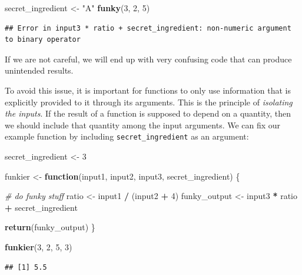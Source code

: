 \documentclass[
]{book}
\newenvironment{Shaded}{\begin{snugshade}}{\end{snugshade}}
\newcommand{\CommentTok}[1]{\textcolor[rgb]{0.56,0.35,0.01}{\textit{#1}}}
\newcommand{\ControlFlowTok}[1]{\textcolor[rgb]{0.13,0.29,0.53}{\textbf{#1}}}
\newcommand{\DecValTok}[1]{\textcolor[rgb]{0.00,0.00,0.81}{#1}}
\newcommand{\FunctionTok}[1]{\textcolor[rgb]{0.13,0.29,0.53}{\textbf{#1}}}
\newcommand{\NormalTok}[1]{#1}
\newcommand{\OtherTok}[1]{\textcolor[rgb]{0.56,0.35,0.01}{#1}}
\newcommand{\SpecialCharTok}[1]{\textcolor[rgb]{0.81,0.36,0.00}{\textbf{#1}}}
\newcommand{\StringTok}[1]{\textcolor[rgb]{0.31,0.60,0.02}{#1}}
\begin{document}
\begin{Shaded}
\begin{Highlighting}[]
\NormalTok{secret\_ingredient }\OtherTok{\textless{}{-}} \StringTok{"A"}
\FunctionTok{funky}\NormalTok{(}\DecValTok{3}\NormalTok{, }\DecValTok{2}\NormalTok{, }\DecValTok{5}\NormalTok{)}
\end{Highlighting}
\end{Shaded}

\begin{verbatim}
## Error in input3 * ratio + secret_ingredient: non-numeric argument to binary operator
\end{verbatim}

If we are not careful, we will end up with very confusing code that can produce unintended results.

To avoid this issue, it is important for functions to only use information that is explicitly provided to it through its arguments.
This is the principle of \emph{isolating the inputs}.
If the result of a function is supposed to depend on a quantity, then we should include that quantity among the input arguments.
We can fix our example function by including \texttt{secret\_ingredient} as an argument:

\begin{Shaded}
\begin{Highlighting}[]
\NormalTok{secret\_ingredient }\OtherTok{\textless{}{-}} \DecValTok{3}

\NormalTok{funkier }\OtherTok{\textless{}{-}} \ControlFlowTok{function}\NormalTok{(input1, input2, input3, secret\_ingredient) \{}
  
  \CommentTok{\# do funky stuff}
\NormalTok{  ratio }\OtherTok{\textless{}{-}}\NormalTok{ input1 }\SpecialCharTok{/}\NormalTok{ (input2 }\SpecialCharTok{+} \DecValTok{4}\NormalTok{)}
\NormalTok{  funky\_output }\OtherTok{\textless{}{-}}\NormalTok{ input3 }\SpecialCharTok{*}\NormalTok{ ratio }\SpecialCharTok{+}\NormalTok{ secret\_ingredient}
  
  \FunctionTok{return}\NormalTok{(funky\_output)  }
\NormalTok{\}}

\FunctionTok{funkier}\NormalTok{(}\DecValTok{3}\NormalTok{, }\DecValTok{2}\NormalTok{, }\DecValTok{5}\NormalTok{, }\DecValTok{3}\NormalTok{)}
\end{Highlighting}
\end{Shaded}

\begin{verbatim}
## [1] 5.5
\end{verbatim}
\end{document}
